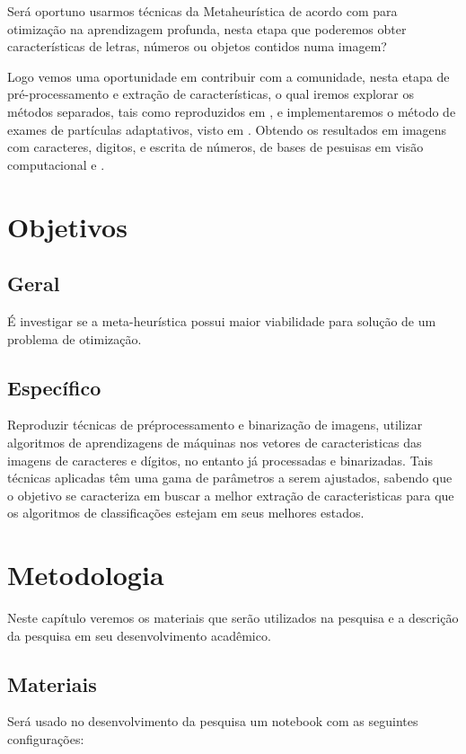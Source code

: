 \documentclass[12pt,a4paper,oneside]{book}
\newcommand\wb[1]{\discretionary{#1}{#1}{#1}}
\begin{document}
Ser\'{a} oportuno usarmos t\'{e}cnicas da Meta\wb-heur\'{i}stica de
acordo com \autocite{MOHAMMAD2017} para otimiza\c{c}\~{a}o na aprendizagem
profunda, nesta etapa que poderemos obter caracter\'{i}sticas de letras,
n\'{u}meros ou objetos contidos numa imagem?

Logo vemos uma oportunidade em contribuir com a comunidade, nesta
etapa de pr\'{e}-processamento e extra\c{c}\~{a}o de caracter\'{i}sticas, o qual
iremos explorar os m\'{e}todos separados, tais como reproduzidos em
\autocite{GUPTA2007}, e implementaremos o m\'{e}todo de exames de part\'{i}culas
adaptativos, visto em \autocite{ZHAN2009}.  Obtendo os resultados em imagens com
caracteres, digitos, e escrita de n\'{u}meros, de bases de pesuisas em vis\~{a}o
computacional \autocite{MNIST2010} e \autocite{CAMPOS2009}.
\pagebreak
\chapter{Objetivos}
\section{Geral}
\'{E} investigar se a meta-heur\'{i}stica possui maior viabilidade para
solu\c{c}\~{a}o de um problema de otimiza\c{c}\~{a}o.
\section{Espec\'{i}fico}
Reproduzir t\'{e}cnicas de pr\'{e}\wb-processamento e binariza\c{c}\~{a}o de
imagens, utilizar algoritmos de aprendizagens de m\'{a}quinas nos vetores de
caracteristicas das imagens de caracteres e d\'{i}gitos, no entanto
j\'{a} processadas e binarizadas. Tais t\'{e}cnicas aplicadas
t\^{e}m uma gama de par\^{a}metros a serem ajustados, sabendo que o objetivo se
caracteriza em buscar a melhor extra\c{c}\~{a}o de caracteristicas para que os
algoritmos de classifica\c{c}\~{o}es estejam em seus melhores estados.
\pagebreak
\chapter{Metodologia}
Neste cap\'{i}tulo veremos os materiais que ser\~{a}o utilizados na pesquisa e a
descri\c{c}\~{a}o da pesquisa em seu desenvolvimento acad\^{e}mico.
\section{Materiais}
\noindent
Ser\'{a} usado no desenvolvimento da pesquisa um notebook com as seguintes configura\c{c}\~{o}es:
\end{document}
